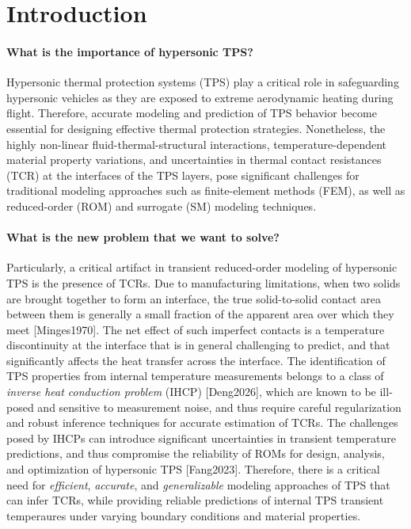 \section{Introduction}

\paragraph{What is the importance of hypersonic TPS?} Hypersonic thermal protection systems (TPS) play a critical role in safeguarding hypersonic vehicles as they are exposed to extreme aerodynamic heating during flight. Therefore, accurate modeling and prediction of TPS behavior become essential for designing effective thermal protection strategies. Nonetheless, the highly non-linear fluid-thermal-structural interactions, temperature-dependent material property variations, and uncertainties in thermal contact resistances (TCR) at the interfaces of the TPS layers, pose significant challenges for traditional modeling approaches such as finite-element methods (FEM), as well as reduced-order (ROM) and surrogate (SM) modeling techniques.

\paragraph{What is the new problem that we want to solve?}
Particularly, a critical artifact in transient reduced-order modeling of hypersonic TPS is the presence of TCRs. Due to manufacturing limitations, when two solids are brought together to form an interface, the true solid-to-solid contact area between them is generally a small fraction of the apparent area over which they meet [Minges1970]. The net effect of such imperfect contacts is a temperature discontinuity at the interface that is in general challenging to predict, and that significantly affects the heat transfer across the interface. The identification of TPS properties from internal temperature measurements belongs to a class of \emph{inverse heat conduction problem} (IHCP) [Deng2026], which are known to be ill-posed and sensitive to measurement noise, and thus require careful regularization and robust inference techniques for accurate estimation of TCRs. The challenges posed by IHCPs can introduce significant uncertainties in transient temperature predictions, and thus compromise the reliability of ROMs for design, analysis, and optimization of hypersonic TPS [Fang2023]. Therefore, there is a critical need for \emph{efficient}, \emph{accurate}, and \emph{generalizable} modeling approaches of TPS that can infer TCRs, while providing reliable predictions of internal TPS transient temperaures under varying boundary conditions and material properties.

